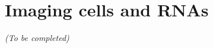 


\section{Imaging cells and RNAs}
\label{sec:fish}

\begin{center}
	\textit{(To be completed)}
\end{center}


